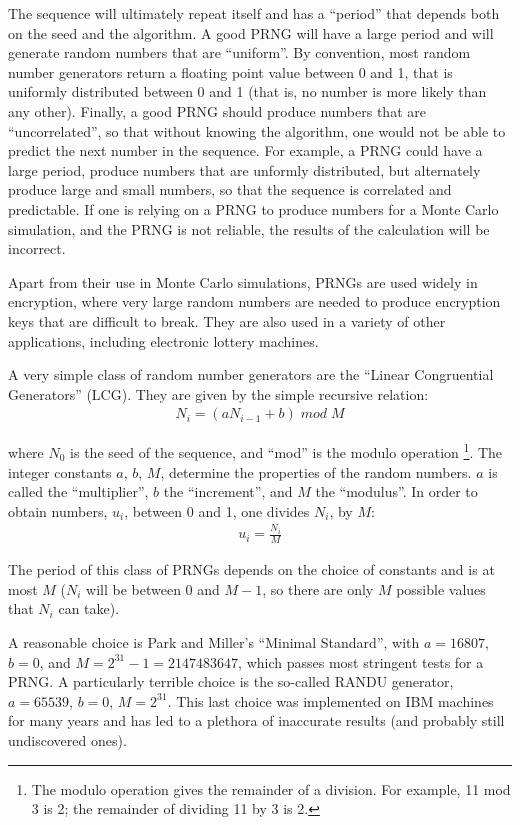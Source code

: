The sequence will ultimately repeat itself and has a ``period'' that depends both on the seed and the algorithm. A good PRNG will have a large period and will generate random numbers that are ``uniform''. By convention, most random number generators return a floating point value between 0 and 1, that is uniformly distributed between 0 and 1 (that is, no number is more likely than any other). Finally, a good PRNG should produce numbers that are ``uncorrelated'', so that without knowing the algorithm, one would not be able to predict the next number in the sequence. For example, a PRNG could have a large period, produce numbers that are unformly distributed, but alternately produce large and small numbers, so that the sequence is correlated and predictable. If one is relying on a PRNG to produce numbers for a Monte Carlo simulation, and the PRNG is not reliable, the results of the calculation will be incorrect.

Apart from their use in Monte Carlo simulations, PRNGs are used widely in encryption, where very large random numbers are needed to produce encryption keys that are difficult to break. They are also used in a variety of other applications, including electronic lottery machines.

A very simple class of random number generators are the ``Linear Congruential Generators'' (LCG). They are given by the simple recursive relation:
\begin{align*}
 N_i = (aN_{i-1} + b) \; mod \; M 
\end{align*}

where $N_0$ is the seed of the sequence, and ``mod'' is the modulo operation \footnote{The modulo operation gives the remainder of a division. For example, 11 mod 3 is 2; the remainder of dividing 11 by 3 is 2.}. The integer constants $a$, $b$, $M$, determine the properties of the random numbers. $a$ is called the ``multiplier'', $b$ the ``increment'', and $M$ the ``modulus''. In order to obtain numbers, $u_i$, between 0 and 1, one divides $N_i$, by $M$:
\begin{align*}
 u_i = \frac{N_i}{M}
\end{align*}

The period of this class of PRNGs depends on the choice of constants and is at most $M$ ($N_i$ will be between 0 and $M-1$, so there are only $M$ possible values that $N_i$ can take).

A reasonable choice is Park and Miller's ``Minimal Standard'', with $a=16807$, $b=0$, and $M=2^{31}-1=2147483647$, which passes most stringent tests for a PRNG. A particularly terrible choice is the so-called RANDU generator, $a=65539$, $b=0$, $M=2^{31}$. This last choice was implemented on IBM machines for many years and has led to a plethora of inaccurate results (and probably still undiscovered ones).  

